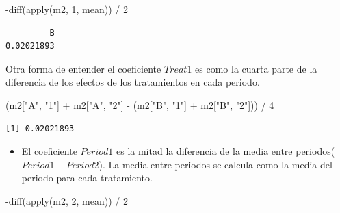 \documentclass[
  12pt,
  a4paper,
  extrafontsizes,
  onecolumn,
  openright,
  table]{memoir}
\newenvironment{Shaded}{\begin{snugshade}}{\end{snugshade}}
\newcommand{\DecValTok}[1]{\textcolor[rgb]{0.68,0.00,0.00}{#1}}
\newcommand{\FunctionTok}[1]{\textcolor[rgb]{0.28,0.35,0.67}{#1}}
\newcommand{\NormalTok}[1]{\textcolor[rgb]{0.00,0.23,0.31}{#1}}
\newcommand{\SpecialCharTok}[1]{\textcolor[rgb]{0.37,0.37,0.37}{#1}}
\newcommand{\StringTok}[1]{\textcolor[rgb]{0.13,0.47,0.30}{#1}}
\providecommand{\tightlist}{%
  \setlength{\itemsep}{0pt}\setlength{\parskip}{0pt}}\usepackage{longtable,booktabs,array}
\begin{document}
\begin{Shaded}
\begin{Highlighting}[]
\SpecialCharTok{{-}}\FunctionTok{diff}\NormalTok{(}\FunctionTok{apply}\NormalTok{(m2, }\DecValTok{1}\NormalTok{, mean)) }\SpecialCharTok{/} \DecValTok{2}
\end{Highlighting}
\end{Shaded}

\begin{verbatim}
         B 
0.02021893 
\end{verbatim}

\normalsize

Otra forma de entender el coeficiente \(Treat1\) es como la cuarta parte
de la diferencia de los efectos de los tratamientos en cada periodo.

\scriptsize

\begin{Shaded}
\begin{Highlighting}[]
\NormalTok{(m2[}\StringTok{"A"}\NormalTok{, }\StringTok{"1"}\NormalTok{] }\SpecialCharTok{+}\NormalTok{ m2[}\StringTok{"A"}\NormalTok{, }\StringTok{"2"}\NormalTok{] }\SpecialCharTok{{-}}\NormalTok{ (m2[}\StringTok{"B"}\NormalTok{, }\StringTok{"1"}\NormalTok{] }\SpecialCharTok{+}\NormalTok{ m2[}\StringTok{"B"}\NormalTok{, }\StringTok{"2"}\NormalTok{])) }\SpecialCharTok{/} \DecValTok{4}
\end{Highlighting}
\end{Shaded}

\begin{verbatim}
[1] 0.02021893
\end{verbatim}

\normalsize

\begin{itemize}
\tightlist
\item
  El coeficiente \(Period1\) es la mitad la diferencia de la media entre
  periodos(\(Period1 - Period2\)). La media entre periodos se calcula
  como la media del periodo para cada tratamiento.
\end{itemize}

\scriptsize

\begin{Shaded}
\begin{Highlighting}[]
\SpecialCharTok{{-}}\FunctionTok{diff}\NormalTok{(}\FunctionTok{apply}\NormalTok{(m2, }\DecValTok{2}\NormalTok{, mean)) }\SpecialCharTok{/} \DecValTok{2}
\end{Highlighting}
\end{Shaded}
\end{document}
